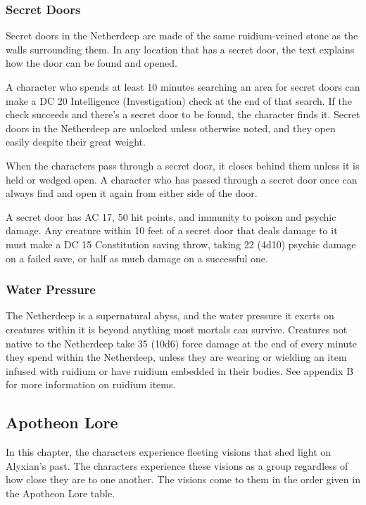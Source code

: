 \documentclass[10pt,a4paper,twoside,bg=print,twocolumn,openany,nodeprecatedcode]{dndbook}
\begin{document}
\subsubsection{Secret Doors}
Secret doors in the Netherdeep are made of the same ruidium-veined stone as the walls surrounding them. In any location that has a secret door, the text explains how the door can be found and opened.



A character who spends at least 10 minutes searching an area for secret doors can make a DC 20 Intelligence (Investigation) check at the end of that search. If the check succeeds and there's a secret door to be found, the character finds it. Secret doors in the Netherdeep are unlocked unless otherwise noted, and they open easily despite their great weight.

When the characters pass through a secret door, it closes behind them unless it is held or wedged open. A character who has passed through a secret door once can always find and open it again from either side of the door.

A secret door has AC 17, 50 hit points, and immunity to poison and psychic damage. Any creature within 10 feet of a secret door that deals damage to it must make a DC 15 Constitution saving throw, taking 22 (4d10) psychic damage on a failed save, or half as much damage on a successful one.


\subsubsection{Water Pressure}
The Netherdeep is a supernatural abyss, and the water pressure it exerts on creatures within it is beyond anything most mortals can survive. Creatures not native to the Netherdeep take 35 (10d6) force damage at the end of every minute they spend within the Netherdeep, unless they are wearing or wielding an item infused with ruidium or have ruidium embedded in their bodies. See appendix B for more information on ruidium items.

\subsection{Apotheon Lore}
In this chapter, the characters experience fleeting visions that shed light on Alyxian's past. The characters experience these visions as a group regardless of how close they are to one another. The visions come to them in the order given in the Apotheon Lore table.
\end{document}
